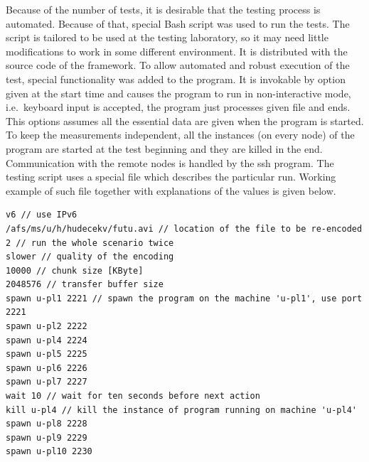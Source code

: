 Because of the number of tests, it is desirable that the testing process
is automated. Because of that, special Bash script was used to run the
tests. The script is tailored to be used at the testing laboratory, so
it may need little modifications to work in some different environment.
It is distributed with the source code of the framework. To allow
automated and robust execution of the test, special functionality was
added to the program. It is invokable by option given at the start time
and causes the program to run in non-interactive mode, i.e.~keyboard
input is accepted, the program just processes given file and ends. This
options assumes all the essential data are given when the program is
started. To keep the measurements independent, all the instances (on
every node) of the program are started at the test beginning and they
are killed in the end. Communication with the remote nodes is handled by
the ssh program. The testing script uses a special file which describes
the particular run. Working example of such file together with
explanations of the values is given below.

\begin{samepage}
\begin{verbatim}
v6 // use IPv6
/afs/ms/u/h/hudecekv/futu.avi // location of the file to be re-encoded
2 // run the whole scenario twice
slower // quality of the encoding
10000 // chunk size [KByte]
2048576 // transfer buffer size
spawn u-pl1 2221 // spawn the program on the machine 'u-pl1', use port 2221
spawn u-pl2 2222
spawn u-pl4 2224
spawn u-pl5 2225
spawn u-pl6 2226
spawn u-pl7 2227
wait 10 // wait for ten seconds before next action
kill u-pl4 // kill the instance of program running on machine 'u-pl4'
spawn u-pl8 2228
spawn u-pl9 2229
spawn u-pl10 2230
\end{verbatim}
\end{samepage}

